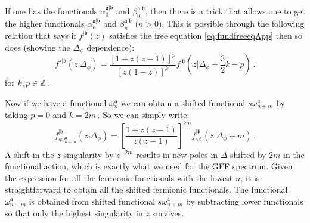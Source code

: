 \documentclass[12pt]{article}
\numberwithin{equation}{section}
\newcommand{\be}{\begin{equation}}
\newcommand{\ee}{\end{equation}}
\newcommand{\ba}{\begin{equation}\begin{aligned}}
\newcommand{\ea}{\end{aligned}\end{equation}}
\def\a{\alpha}
\def\b{\beta}
\def\D{\Delta}
\newcommand{\mf}[1]{\mathfrak #1}
\begin{document}
	If one has the functionals $\a^{\mf a|\mf b}_{0}$ and $\b^{\mf a|\mf b}_{0}$, then there is a trick that allows one to get the higher functionals $\a^{\mf a|\mf b}_{n}$ and $\b^{\mf a|\mf b}_{n}$ ($n>0$). 
	This is possible through the following relation that says if $f^{|\mf b}(z)$ satisfies the free equation \eqref{eq:fundfreeeqApp} then so does (showing the $\D_\phi$ dependence):
	\be\label{trick}
	f'^{|\mf b}(z|\D_\phi)= \frac{[1+z(z-1)]^p}{[z(1-z)]^k} f^{|\mf b}(z| \D_\phi+\frac{3}{2}k-p)\,.
	\ee
	for $k,p\in \mathbb{Z}$\,.
	
	Now if we have a functional $\omega^{\mf a}_{n}$ we can obtain a shifted functional $s\omega^{\mf a}_{n+m}$ by taking $p=0$ and $k=2m$\,. So we can simply write:
	\be\label{inc-n}
	f_{s\omega_{n+m}^{\mf a}}^{|\mf b}(z|\D_\phi)= \left[\frac{1+z(z-1)}{z(z-1)}\right]^{2m} f_{\omega_{n}^{\mf a}}^{|\mf b}(z| \D_\phi+m)\,.
	\ee
	A shift in the $z$-singularity by $z^{-2m}$ results in new poles in $\D$ shifted by $2m$ in the functional action, which is exactly what we need for the GFF spectrum.  
	Given the expression for all the fermionic  functionals with the lowest $n$, it is straightforward to obtain all the shifted fermionic functionals. The functional $\omega_{n+m}^{\mf a}$ is obtained from shifted functional $s\omega_{n+m}^{\mf a}$  by subtracting lower functionals so that only the highest singularity in $z$ survives.
	
\end{document}

